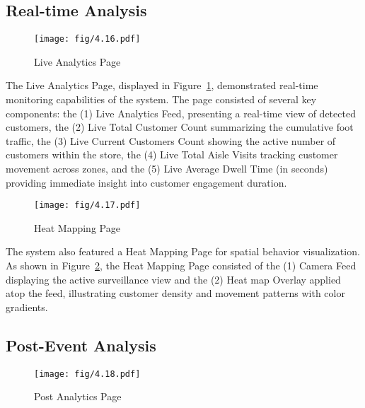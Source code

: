 {\subsection{Real-time Analysis}

\begin{figure}[H]
	\caption[Live Analytics Page]{\newline \newline Live Analytics Page}
	\centering
	\texttt{[image: fig/4.16.pdf]}
	\label{fig:4.16}
\end{figure}

The Live Analytics Page, displayed in Figure~\ref{fig:4.16}, demonstrated real-time monitoring capabilities of the system. The page consisted of several key components: the (1) Live Analytics Feed, presenting a real-time view of detected customers, the (2) Live Total Customer Count summarizing the cumulative foot traffic, the (3) Live Current Customers Count showing the active number of customers within the store, the (4) Live Total Aisle Visits tracking customer movement across zones, and the (5) Live Average Dwell Time (in seconds) providing immediate insight into customer engagement duration.

\begin{figure}[H]
	\caption[Heat Mapping Page]{\newline \newline Heat Mapping Page}
	\centering
	\texttt{[image: fig/4.17.pdf]}
	\label{fig:4.17}
\end{figure}

The system also featured a Heat Mapping Page for spatial behavior visualization. As shown in Figure~\ref{fig:4.17}, the Heat Mapping Page consisted of the (1) Camera Feed displaying the active surveillance view and the (2) Heat map Overlay applied atop the feed, illustrating customer density and movement patterns with color gradients.

\subsection{Post-Event Analysis}

\begin{figure}[H]
	\caption[Post Analytics Page]{\newline \newline Post Analytics Page}
	\centering
	\texttt{[image: fig/4.18.pdf]}
	\label{fig:4.18}
\end{figure}

}
